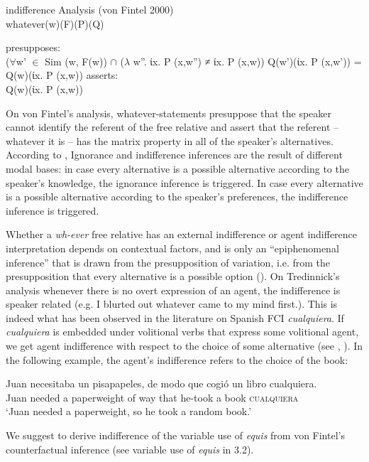 \documentclass[output=paper
,modfonts
,nonflat]{langsci/langscibook}
\begin{document}
\ea indifference Analysis (von Fintel 2000)\\
whatever(w)(F)(P)(Q)
\begin{xlist}
\ex presupposes:\\
{($\forall$w’ $\in$ Sim (w, F(w)) $\cap$ ($\lambda$ w”. ίx. P (x,w”) ≠ ίx. P (x,w)) 
	Q(w’)(ίx. P (x,w’)) = Q(w)(ίx. P (x,w))} 
\ex	asserts:\\
{Q(w)(ίx. P (x,w))}
\end{xlist}
\z

On von Fintel’s analysis, whatever-statements presuppose that the speaker cannot identify the referent of the free relative and assert that the referent -- whatever it is -- has the matrix property in all of the speaker's alternatives. According to \cite{Fintel2000}, Ignorance and indifference inferences are the result of different modal bases: in case every alternative is a possible alternative according to the speaker’s knowledge, the ignorance inference is triggered. In case every alternative is a possible alternative according to the speaker's preferences, the indifference inference is triggered.

Whether a \textit{wh-ever} free relative has an external indifference or agent indifference interpretation depends on contextual factors, and is only an “epiphenomenal inference” that is drawn from the presupposition of variation, i.e. from the presupposition that every alternative is a possible option (\citealt[108]{Tredinnick2005}). On Tredinnick’s analysis whenever there is no overt expression of an agent, the indifference is speaker related (e.g. I blurted out whatever came to my mind first.). This is indeed what has been observed in the literature on Spanish FCI \textit{cualquiera}. If \textit{cualquiera} is embedded under volitional verbs that express some volitional agent, we get agent indifference with respect to the choice of some alternative (see \citealt{CR2008}, \citealt{AM2011}). In the following example, the agent’s indifference refers to the choice of the book:

\ea 
\gll Juan necesitaba un pisapapeles, de modo que cogió un libro cualquiera.\\
Juan needed a paperweight of way that he-took a book \textsc{cualquiera}\\
\glt ‘Juan needed a paperweight, so he took a random book.’
\z

We suggest to derive indifference of the variable use of \textit{equis} from von Fintel's counterfactual inference (see variable use of \textit{equis} in 3.2).
\end{document}
